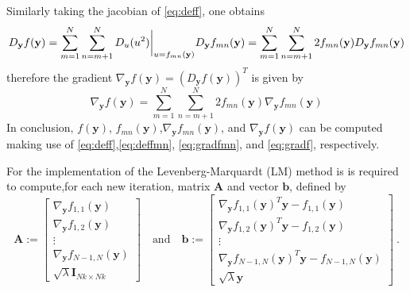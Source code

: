 \documentclass[12pt]{article}
\begin{document}
Similarly taking the jacobian of \eqref{eq:deff}, one obtains
\begin{equation*}\label{key}
D_{\mathbf{y}}f(\mathbf{y}) = \sum_{m=1}^{N}\sum_{n=m+1}^{N} D_u(u^2)\biggr\rvert_{u=f_{mn}(\mathbf{y})}D_{\mathbf{y}}f_{mn}(\mathbf{y})\\= \sum_{m=1}^{N}\sum_{n=m+1}^{N} 2f_{mn}(\mathbf{y})D_{\mathbf{y}}f_{mn}(\mathbf{y})
\end{equation*}
therefore the gradient $\nabla_{\mathbf{y}} f(\mathbf{y}) = \left(D_{\mathbf{y}}f(\mathbf{y})\right)^T$ is given by
\begin{equation}\label{eq:gradf}
\nabla_{\mathbf{y}} f(\mathbf{y}) = \sum_{m=1}^{N}\sum_{n=m+1}^{N} 2f_{mn}(\mathbf{y})\nabla_{\mathbf{y}}f_{mn}(\mathbf{y})
\end{equation}
In conclusion, $f(\mathbf{y})$, $f_{mn}(\mathbf{y})$,$\nabla_{\mathbf{y}} f_{mn}(\mathbf{y})$, and $\nabla_{\mathbf{y}} f(\mathbf{y})$ can be computed making use of \eqref{eq:deff},\eqref{eq:deffmn}, \eqref{eq:gradfmn}, and \eqref{eq:gradf}, respectively. 

For the implementation of the Levenberg-Marquardt (LM) method is is required to compute,for each new iteration, matrix $\mathbf{A}$ and vector $\mathbf{b}$, defined by
\begin{equation}\label{key}
\mathbf{A}:= \begin{bmatrix}
\nabla_{\mathbf{y}} f_{1,1}(\mathbf{y})\\
\nabla_{\mathbf{y}} f_{1,2}(\mathbf{y})\\\vdots\\
\nabla_{\mathbf{y}} f_{N-1,N}(\mathbf{y})\\
\sqrt{\lambda}\mathbf{I}_{Nk\times Nk}
\end{bmatrix}\quad \text{and} \quad \mathbf{b}:= \begin{bmatrix}
\nabla_{\mathbf{y}} f_{1,1}(\mathbf{y})^T\mathbf{y}-f_{1,1}(\mathbf{y})\\
\nabla_{\mathbf{y}} f_{1,2}(\mathbf{y})^T\mathbf{y}-f_{1,2}(\mathbf{y})\\\vdots\\
\nabla_{\mathbf{y}} f_{N-1,N}(\mathbf{y})^T\mathbf{y}-f_{N-1,N}(\mathbf{y})\\
\sqrt{\lambda}\mathbf{y}
\end{bmatrix}\:.
\end{equation}
\end{document}
